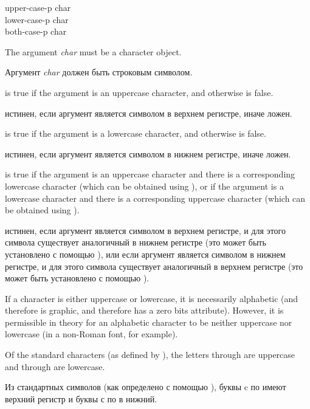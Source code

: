 \begin{defun}[Function]
upper-case-p char \\
lower-case-p char \\
both-case-p char

The argument \emph{char} must be a character object.

Аргумент \emph{char} должен быть строковым символом.

 is true if the argument is an uppercase
character, and otherwise is false.

 истинен, если аргумент является символом в верхнем регистре,
иначе ложен.

 is true if the argument is a lowercase
character, and otherwise is false.

 истинен, если аргумент является символом в нижнем регистре,
иначе ложен.

 is true if the argument is an uppercase character and
there is a corresponding lowercase character (which can be obtained
using ), or if the argument is a lowercase character and
there is a corresponding uppercase character (which can be obtained
using ).

 истинен, если аргумент является символом в верхнем регистре,
и для этого символа существует аналогичный в нижнем регистре (это может быть
установлено с помощью ), или если аргумент является символом
в нижнем регистре, 
и для этого символа существует аналогичный в верхнем регистре (это может быть
установлено с помощью ).

If a character is either uppercase or lowercase, it is necessarily
alphabetic (and therefore is graphic, and therefore has a zero bits
attribute).  However, it is permissible in theory for an alphabetic
character to be neither uppercase nor lowercase (in a non-Roman font,
for example).

Of the standard characters (as defined by ),
the letters  through  are uppercase and 
through  are lowercase.

Из стандартных символов (как определено с помощью ), буквы
c  по  имеют верхний регистр и буквы с  по  в нижний.
\end{defun}

